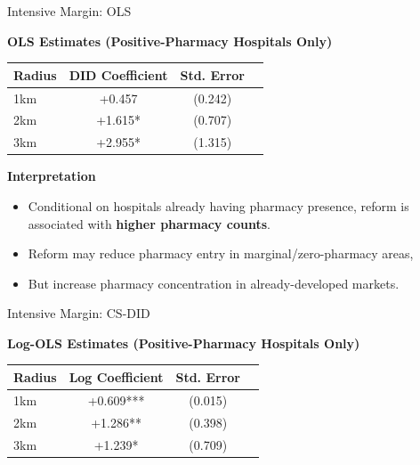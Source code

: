 \documentclass{beamer}
\begin{document}
\begin{frame}{Intensive Margin: OLS}


\textbf{OLS Estimates (Positive-Pharmacy Hospitals Only)}

\begin{table}[htbp]
\centering
\small
\begin{tabular}{lccc}
\toprule
\textbf{Radius} & \textbf{DID Coefficient} & \textbf{Std. Error}  \\
\midrule
1km & +0.457 & (0.242)  \\
2km & +1.615* & (0.707)  \\
3km & +2.955* & (1.315)  \\
\bottomrule
\end{tabular}
\end{table}

\vspace{0.3cm}

\textbf{Interpretation}

\begin{itemize}
    \item Conditional on hospitals already having pharmacy presence, reform is associated with \textbf{higher pharmacy counts}.
    \item Reform may reduce pharmacy entry in marginal/zero-pharmacy areas,
    \item But increase pharmacy concentration in already-developed markets.
\end{itemize}  

\end{frame}


\begin{frame}{Intensive Margin: CS-DID}

\textbf{Log-OLS Estimates (Positive-Pharmacy Hospitals Only)}

\begin{table}[htbp]
\centering
\small
\begin{tabular}{lccc}
\toprule
\textbf{Radius} & \textbf{Log Coefficient} & \textbf{Std. Error} \\
\midrule
1km & +0.609*** & (0.015) \\
2km & +1.286** & (0.398) \\
3km & +1.239* & (0.709) \\
\bottomrule
\end{tabular}
\end{table}

\end{frame}
\end{document}
